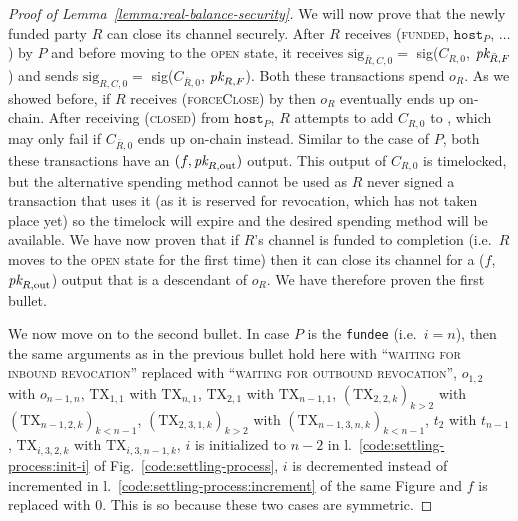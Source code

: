 \begin{proof}[Proof of Lemma~\ref{lemma:real-balance-security}]
  We will now prove that the newly funded party $R$ can close its channel
  securely. After $R$ receives (\textsc{funded}, $\texttt{host}_P$, $\dots$) by
  $P$ and before moving to the \textsc{open} state, it receives
  $\mathrm{sig}_{\bar{R}, C, 0} =$ sig($C_{R, 0}$, $\textit{pk}_{\bar{R}, F}$) and sends
  $\mathrm{sig}_{R, C, 0} =$ sig($C_{\bar{R}, 0}$, $\textit{pk}_{R, F}$). Both these
  transactions spend $o_R$. As we showed before, if $R$ receives
  (\textsc{forceClose}) by \environment then $o_R$ eventually ends up on-chain. After
  receiving (\textsc{closed}) from $\texttt{host}_P$, $R$ attempts to add $C_{R,
  0}$ to \ledger, which may only fail if $C_{\bar{R}, 0}$ ends up on-chain
  instead. Similar to the case of $P$, both these transactions have an $(f,
  \textit{pk}_{R, \mathrm{out}})$ output. This output of $C_{R, 0}$ is timelocked, but
  the alternative spending method cannot be used as $R$ never signed a
  transaction that uses it (as it is reserved for revocation, which has not
  taken place yet) so the timelock will expire and the desired spending method
  will be available. We have now proven that if $R$'s channel is funded to
  completion (i.e.\ $R$ moves to the \textsc{open} state for the first time) then
  it can close its channel for a ($f$, $\textit{pk}_{R, \mathrm{out}}$) output that is a
  descendant of $o_R$. We have therefore proven the first bullet.

  We now move on to the second bullet. In case $P$ is the \texttt{fundee} (i.e.\
  $i=n$), then the same arguments as in the previous bullet hold here with
  ``\textsc{waiting for inbound revocation}'' replaced with ``\textsc{waiting
  for outbound revocation}'', $o_{1, 2}$ with $o_{n-1, n}$, $\mathrm{TX}_{1, 1}$
  with $\mathrm{TX}_{n, 1}$, $\mathrm{TX}_{2, 1}$ with $\mathrm{TX}_{n-1, 1}$,
  $(\mathrm{TX}_{2, 2, k})_{k > 2}$ with $(\mathrm{TX}_{n-1, 2, k})_{k < n-1}$,
  $(\mathrm{TX}_{2, 3, 1, k})_{k > 2}$ with $(\mathrm{TX}_{n-1, 3, n, k})_{k <
  n-1}$, $t_2$ with $t_{n-1}$, $\mathrm{TX}_{i, 3, 2, k}$ with $\mathrm{TX}_{i,
  3, n-1, k}$, $i$ is initialized to $n-2$ in
  l.~\ref{code:settling-process:init-i} of Fig.~\ref{code:settling-process}, $i$
  is decremented instead of incremented in
  l.~\ref{code:settling-process:increment} of the same Figure and $f$ is
  replaced with $0$. This is so because these two cases are symmetric.


\end{proof}
